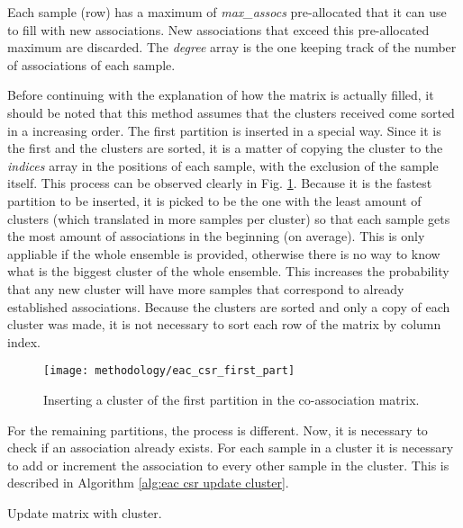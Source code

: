 Each sample (row) has a maximum of \emph{max\_assocs} pre-allocated that it can use to fill with new associations.
New associations that exceed this pre-allocated maximum are discarded.
The \emph{degree} array is the one keeping track of the number of associations of each sample.

Before continuing with the explanation of how the matrix is actually filled, it should be noted that this method assumes that the clusters received come sorted in a increasing order.
The first partition is inserted in a special way.
Since it is the first and the clusters are sorted, it is a matter of copying the cluster to the \emph{indices} array in the positions of each sample, with the exclusion of the sample itself.
This process can be observed clearly in Fig. \ref{fig:first part}.
Because it is the fastest partition to be inserted, it is picked to be the one with the least amount of clusters (which translated in more samples per cluster) so that each sample gets the most amount of associations in the beginning (on average).
This is only appliable if the whole ensemble is provided, otherwise there is no way to know what is the biggest cluster of the whole ensemble.
This increases the probability that any new cluster will have more samples that correspond to already established associations.
Because the clusters are sorted and only a copy of each cluster was made, it is not necessary to sort each row of the matrix by column index.

\begin{figure}[hbtp]
\centering
\texttt{[image: methodology/eac\_csr\_first\_part]}
\caption{Inserting a cluster of the first partition in the co-association matrix.}
\label{fig:first part}
\end{figure}

For the remaining partitions, the process is different.
Now, it is necessary to check if an association already exists.
For each sample in a cluster it is necessary to add or increment the association to every other sample in the cluster.
This is described in Algorithm \ref{alg:eac csr update cluster}.


\begin{algorithm}
\caption{Update matrix with cluster.}\label{alg:eac csr update cluster}
\begin{algorithmic}[1]
		\Else
            \EndIf
		\EndIf
	\EndFor
\EndFor
\EndProcedure
\end{algorithmic}
\end{algorithm}


